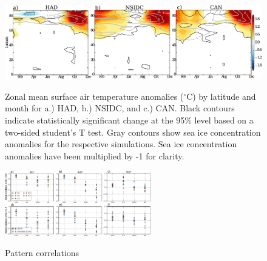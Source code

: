 \documentclass[twocol]{ametsoc}
\begin{document}
\begin{figure}[t]
  \noindent\includegraphics[width=39pc,angle=0]{SATwithlat.pdf}\\
  \caption{Zonal mean surface air temperature anomalies ($^\circ$C) by latitude and month for a.) HAD, b.) NSIDC, and c.) CAN. Black contours indicate statistically significant change at the 95\% level based on a two-sided student's T test. Gray contours show sea ice concentration anomalies for the respective simulations. Sea ice concentration anomalies have been multiplied by -1 for clarity.
}\label{f1b}
\end{figure}

\begin{figure}
  \noindent\includegraphics[width=15pc,angle=0]{pattcorrseas.pdf}\\
  \caption{Pattern correlations
}\label{fig:fig4}
\end{figure}

\clearpage


%
\end{document}
